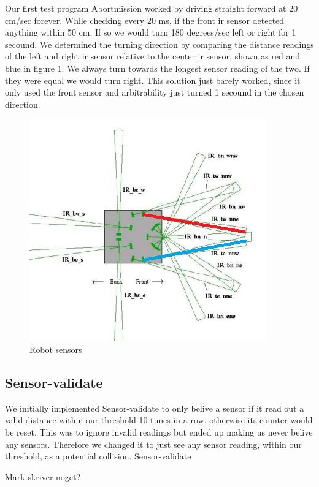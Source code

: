 \documentclass[a4paper,12pt]{article}
\begin{document}
Our first test program Abortmission worked by driving straight forward at 20 cm/sec forever. While checking every 20 ms, if the front ir sensor detected anything within 50 cm. If so we would turn 180 degrees/sec left or right for 1 secound. We determined the turning direction by comparing the distance readings of the left and right ir sensor relative to the center ir sensor, shown as red and blue in figure 1. We always turn towards the longest sensor reading of the two. If they were equal we would turn right.
\newline
\newline
This solution just barely worked, since it only used the front sensor and arbitrability just turned 1 secound in the chosen direction.

\begin{figure}
\includegraphics{robot2.png}
\caption{Robot sensors}
\end{figure}

\subsection{Sensor-validate}

We initially implemented Sensor-validate to only belive a sensor if it read out a valid distance within our threshold 10 times in a row, otherwise its counter would be reset. This was to ignore invalid readings but ended up making us never belive any sensors. Therefore we changed it to just see any sensor reading, within our threshold, as a potential collision.
\newline
\newline
Sensor-validate

Mark skriver noget?
\end{document}
